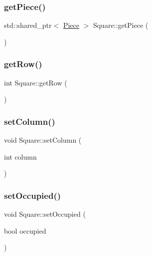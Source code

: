 \subsubsection{\texorpdfstring{get\+Piece()}{getPiece()}}
{\footnotesize\ttfamily std\+::shared\+\_\+ptr$<$ \hyperlink{class_piece}{Piece} $>$ Square\+::get\+Piece (\begin{DoxyParamCaption}{ }\end{DoxyParamCaption})}

\mbox{\label{class_square_ad3391313a44cdbfbe87fd3ddc545feac}} 
\subsubsection{\texorpdfstring{get\+Row()}{getRow()}}
{\footnotesize\ttfamily int Square\+::get\+Row (\begin{DoxyParamCaption}{ }\end{DoxyParamCaption})}

\mbox{\label{class_square_a759f5441bdd5499b33658c00c2179556}} 
\subsubsection{\texorpdfstring{set\+Column()}{setColumn()}}
{\footnotesize\ttfamily void Square\+::set\+Column (\begin{DoxyParamCaption}\item[{int}]{column }\end{DoxyParamCaption})}

\mbox{\label{class_square_a0a86c9e5d8d00ad8d33f4a8f11c0186d}} 
\subsubsection{\texorpdfstring{set\+Occupied()}{setOccupied()}}
{\footnotesize\ttfamily void Square\+::set\+Occupied (\begin{DoxyParamCaption}\item[{bool}]{occupied }\end{DoxyParamCaption})}

